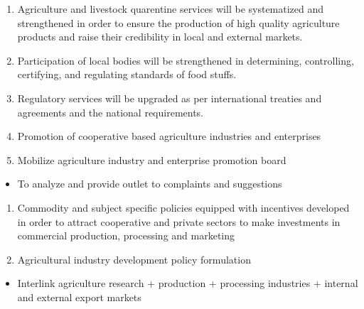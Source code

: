 \documentclass[
  openany]{book}
\providecommand{\tightlist}{%
  \setlength{\itemsep}{0pt}\setlength{\parskip}{0pt}}
\begin{document}
\begin{itemize}
  \begin{enumerate}
  \def\labelenumi{\arabic{enumi}.}
  \setcounter{enumi}{10}
  \tightlist
  \item
    Agriculture and livestock quarentine services will be systematized and strengthened in order to ensure the production of high quality agriculture products and raise their credibility in local and external markets.
  \item
    Participation of local bodies will be strengthened in determining, controlling, certifying, and regulating standards of food stuffs.
  \item
    Regulatory services will be upgraded as per international treaties and agreements and the national requirements.
  \item
    Promotion of cooperative based agriculture industries and enterprises
  \item
    Mobilize agriculture industry and enterprise promotion board
  \end{enumerate}

  \begin{itemize}
  \tightlist
  \item
    To analyze and provide outlet to complaints and suggestions
  \end{itemize}

  \begin{enumerate}
  \def\labelenumi{\arabic{enumi}.}
  \setcounter{enumi}{15}
  \tightlist
  \item
    Commodity and subject specific policies equipped with incentives developed in order to attract cooperative and private sectors to make investments in commercial production, processing and marketing
  \item
    Agricultural industry development policy formulation
  \end{enumerate}

  \begin{itemize}
  \tightlist
  \item
    Interlink agriculture research + production + processing industries + internal and external export markets
  \end{itemize}


\end{itemize}
\end{document}
